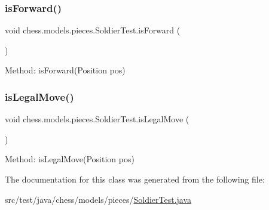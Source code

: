 \subsubsection{\texorpdfstring{is\+Forward()}{isForward()}}
{\footnotesize\ttfamily void chess.\+models.\+pieces.\+Soldier\+Test.\+is\+Forward (\begin{DoxyParamCaption}{ }\end{DoxyParamCaption})}

Method\+: is\+Forward(\+Position pos) \mbox{\label{classchess_1_1models_1_1pieces_1_1_soldier_test_ad6deec316336baea729d2c952597cbf7}} 
\subsubsection{\texorpdfstring{is\+Legal\+Move()}{isLegalMove()}}
{\footnotesize\ttfamily void chess.\+models.\+pieces.\+Soldier\+Test.\+is\+Legal\+Move (\begin{DoxyParamCaption}{ }\end{DoxyParamCaption})}

Method\+: is\+Legal\+Move(\+Position pos) 

The documentation for this class was generated from the following file\+:\begin{DoxyCompactItemize}
\item 
src/test/java/chess/models/pieces/\mbox{\hyperlink{_soldier_test_8java}{Soldier\+Test.\+java}}\end{DoxyCompactItemize}
